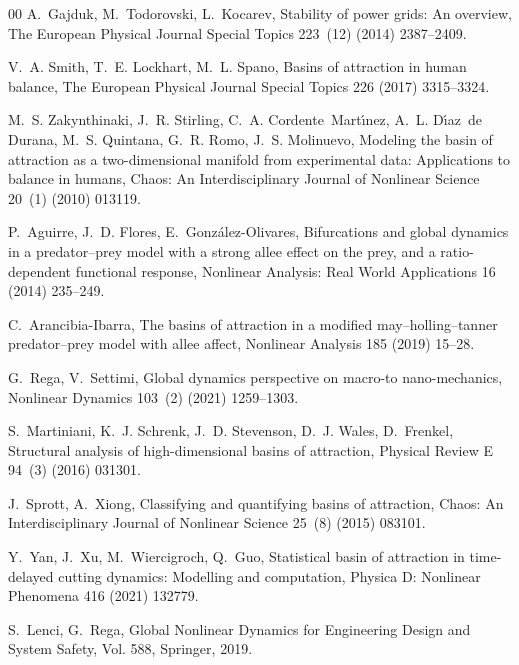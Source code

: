 \documentclass[preprint,12pt]{elsarticle}
\begin{document}
\begin{thebibliography}{00}
		A.~Gajduk, M.~Todorovski, L.~Kocarev, Stability of power grids: An overview,
		The European Physical Journal Special Topics 223~(12) (2014) 2387--2409.
		
		V.~A. Smith, T.~E. Lockhart, M.~L. Spano, Basins of attraction in human
		balance, The European Physical Journal Special Topics 226 (2017) 3315--3324.
		
		M.~S. Zakynthinaki, J.~R. Stirling, C.~A. Cordente~Mart{\'\i}nez, A.~L.
		D{\'\i}az~de Durana, M.~S. Quintana, G.~R. Romo, J.~S. Molinuevo, Modeling
		the basin of attraction as a two-dimensional manifold from experimental data:
		Applications to balance in humans, Chaos: An Interdisciplinary Journal of
		Nonlinear Science 20~(1) (2010) 013119.
		
		P.~Aguirre, J.~D. Flores, E.~Gonz{\'a}lez-Olivares, Bifurcations and global
		dynamics in a predator--prey model with a strong allee effect on the prey,
		and a ratio-dependent functional response, Nonlinear Analysis: Real World
		Applications 16 (2014) 235--249.
		
		C.~Arancibia-Ibarra, The basins of attraction in a modified
		may--holling--tanner predator--prey model with allee affect, Nonlinear
		Analysis 185 (2019) 15--28.
		
		G.~Rega, V.~Settimi, Global dynamics perspective on macro-to nano-mechanics,
		Nonlinear Dynamics 103~(2) (2021) 1259--1303.
		
		S.~Martiniani, K.~J. Schrenk, J.~D. Stevenson, D.~J. Wales, D.~Frenkel,
		Structural analysis of high-dimensional basins of attraction, Physical Review
		E 94~(3) (2016) 031301.
		
		J.~Sprott, A.~Xiong, Classifying and quantifying basins of attraction, Chaos:
		An Interdisciplinary Journal of Nonlinear Science 25~(8) (2015) 083101.
		
		Y.~Yan, J.~Xu, M.~Wiercigroch, Q.~Guo, Statistical basin of attraction in
		time-delayed cutting dynamics: Modelling and computation, Physica D:
		Nonlinear Phenomena 416 (2021) 132779.
		
		S.~Lenci, G.~Rega, Global Nonlinear Dynamics for Engineering Design and System
		Safety, Vol. 588, Springer, 2019.
		

\end{thebibliography}
\end{document}
